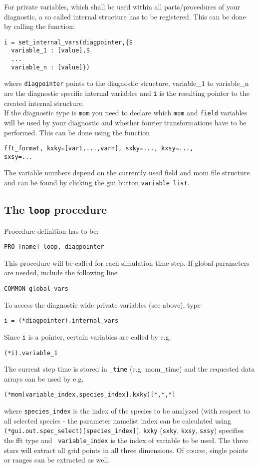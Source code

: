 \documentclass[12pt]{article}
\begin{document}
For private variables, which shall be used within all parts/procedures of
your diagnostic, a so called internal structure has to be registered.
This can be done by calling the function:
\begin{verbatim}
i = set_internal_vars(diagpointer,{$
  variable_1 : [value],$
  ...
  variable_n : [value]})
\end{verbatim}

where {\tt diagpointer} points to the diagnostic structure, variable\_1
to variable\_n are the diagnostic specific internal variables and {\tt i}
is the resulting pointer to the created internal structure. \\

If the diagnostic type is \texttt{mom} you need to declare which {\tt mom}
and {\tt field} variables will be used by your diagnostic and whether
fourier transformations have to be performed. This can be done using the
function
\begin{verbatim}
fft_format, kxky=[var1,...,varn], sxky=..., kxsy=...,
sxsy=...
\end{verbatim}
The variable numbers depend on the currently used field and mom file
structure and can be found by clicking the gui button {\tt variable list}.


\subsection{The \texttt{loop} procedure}

Procedure definition has to be:
\begin{verbatim}
PRO [name]_loop, diagpointer
\end{verbatim}

This procedure will be called for each simulation time step. If global
parameters are needed, include the following line
\begin{verbatim}
COMMON global_vars
\end{verbatim}
To access the diagnostic wide private variables (see above), type
\begin{verbatim}
i = (*diagpointer).internal_vars
\end{verbatim}
Since {\tt i} is a pointer, certain variables are called by e.g.
\begin{verbatim}
(*i).variable_1
\end{verbatim}
The current step time is stored in {\tt <diagnostic type>\_time} 
(e.g. mom\_time) and the requested data arrays can be used by e.g.
\begin{verbatim}
(*mom[variable_index,species_index].kxky)[*,*,*]
\end{verbatim}
where {\tt species\_index} is the index of the species to be
analyzed (with respect to all selected species - the parameter
namelist index can be calculated using {\tt
(*gui.out.spec\_select)[species\_index]}), {\tt kxky} ({\tt sxky},
{\tt kxsy}, {\tt sxsy}) specifies the fft type and {\tt
variable\_index} is the index of variable to be used. The three
stars will extract all grid points in all three dimensions. Of
course, single points or ranges can be extracted as well.
\end{document}

